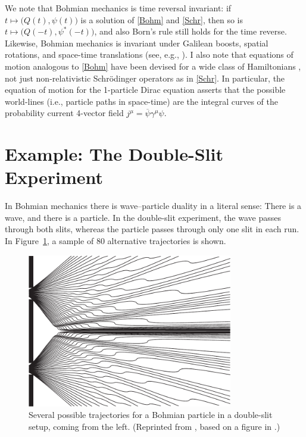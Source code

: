 \documentclass[12pt]{article}
\begin{document}
We note that Bohmian mechanics is time reversal invariant: if $t\mapsto \bigl(Q(t),\psi(t)\bigr)$ is a solution of \eqref{Bohm} and \eqref{Schr}, then so is $t\mapsto \bigl(Q(-t),\psi^*(-t)\bigr)$, and also Born's rule still holds for the time reverse. Likewise, Bohmian mechanics is invariant under Galilean boosts, spatial rotations, and space-time translations (see, e.g., \cite{DGZ92}). I also note that equations of motion analogous to \eqref{Bohm} have been devised for a wide class of Hamiltonians \cite{SV09}, not just non-relativistic Schr\"odinger operators as in \eqref{Schr}. In particular, the equation of motion for the 1-particle Dirac equation \cite{Bohm53,BH} asserts that the possible world-lines (i.e., particle paths in space-time) are the integral curves of the probability current 4-vector field $j^\mu=\overline{\psi}\gamma^\mu \psi$.




\section{Example: The Double-Slit Experiment}

In Bohmian mechanics there is wave--particle duality in a literal sense: There is a wave, and there is a particle. In the double-slit experiment, the wave passes through both slits, whereas the particle passes through only one slit in each run. In Figure~\ref{pic}, a sample of 80 alternative trajectories is shown.

\begin{figure}[h]
\begin{center} 
  \includegraphics[width=0.8\textwidth]{Grafik1.pdf}
\end{center}
 \caption{Several possible trajectories for a Bohmian particle in a double-slit setup, coming from the left. (Reprinted from \cite{DT}, based on a figure in \cite{philippidis79}.)}\label{pic}
\end{figure}
\end{document}

